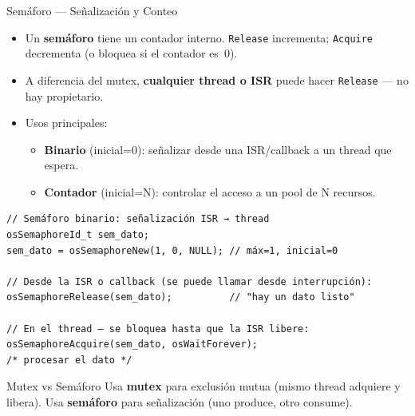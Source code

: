 \begin{frame}[fragile]{Semáforo — Señalización y Conteo}
    \begin{itemize}
        \item Un \textbf{semáforo} tiene un contador interno.
              \texttt{Release} incrementa; \texttt{Acquire} decrementa
              (o bloquea si el contador es~0).
        \item A diferencia del mutex, \textbf{cualquier thread o ISR}
              puede hacer \texttt{Release} — no hay propietario.
        \item Usos principales:
            \begin{itemize}
                \item \textbf{Binario} (inicial=0): señalizar desde una
                      ISR/callback a un thread que espera.
                \item \textbf{Contador} (inicial=N): controlar el acceso
                      a un pool de N recursos.
            \end{itemize}
    \end{itemize}
    \begin{verbatim}
// Semáforo binario: señalización ISR → thread
osSemaphoreId_t sem_dato;
sem_dato = osSemaphoreNew(1, 0, NULL); // máx=1, inicial=0

// Desde la ISR o callback (se puede llamar desde interrupción):
osSemaphoreRelease(sem_dato);          // "hay un dato listo"

// En el thread — se bloquea hasta que la ISR libere:
osSemaphoreAcquire(sem_dato, osWaitForever);
/* procesar el dato */
    \end{verbatim}
    \begin{alertblock}{Mutex vs Semáforo}
        Usa \textbf{mutex} para exclusión mutua (mismo thread adquiere
        y libera). Usa \textbf{semáforo} para señalización (uno produce,
        otro consume).
    \end{alertblock}
\end{frame}

